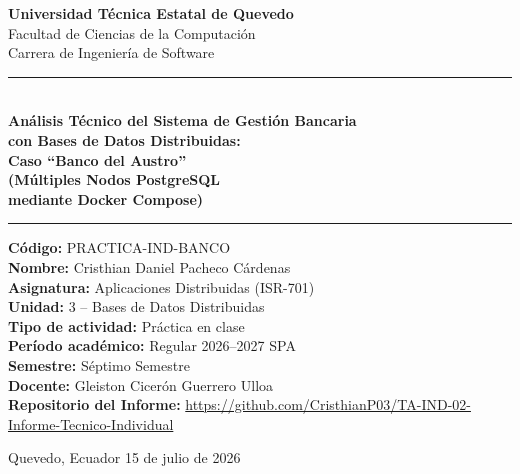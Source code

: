 \documentclass[12pt, a4paper]{article}
\begin{document}
\begin{titlepage}
\centering
\vspace*{0.5cm}
{\large\bfseries Universidad Técnica Estatal de Quevedo}\\[6pt]
{\normalsize Facultad de Ciencias de la Computación}\\[4pt]
{\normalsize Carrera de Ingeniería de Software}

\vspace{1cm}
\rule{\linewidth}{1pt}\\[10pt]
{\Large\bfseries
  Análisis Técnico del Sistema de Gestión Bancaria\\[4pt]
  con Bases de Datos Distribuidas:\\[4pt]
  Caso ``Banco del Austro'' \\[4pt]
  (Múltiples Nodos PostgreSQL \\[4pt]
  mediante Docker Compose)
}
\vspace{2pt}
\rule{\linewidth}{1pt}

\vspace{1.2cm}
{\normalsize
  \textbf{Código:} PRACTICA-IND-BANCO\\[4pt]
  \textbf{Nombre:} Cristhian Daniel Pacheco Cárdenas\\[4pt]
  \textbf{Asignatura:} Aplicaciones Distribuidas (ISR-701)\\[4pt]
  \textbf{Unidad:} 3 -- Bases de Datos Distribuidas\\[4pt]
  \textbf{Tipo de actividad:} Práctica en clase\\[4pt]
  \textbf{Período académico:} Regular 2026--2027 SPA\\[4pt]
  \textbf{Semestre:} Séptimo Semestre\\[4pt]
  \textbf{Docente:} Gleiston Cicerón Guerrero Ulloa\\[4pt]
  \textbf{Repositorio del Informe:} \url{https://github.com/CristhianP03/TA-IND-02-Informe-Tecnico-Individual}
}

\vspace{2.2cm}
{\small Quevedo, Ecuador \textperiodcentered{} 15 de julio de 2026}
\end{titlepage}

\newpage
\tableofcontents
\newpage
\end{document}
